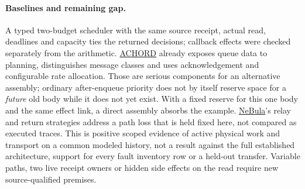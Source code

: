 \documentclass[11pt]{article}
\begin{document}
\paragraph{Baselines and remaining gap.}
A typed two-budget scheduler with the same source receipt,
actual read, deadlines and capacity ties the returned
decisions; callback effects were checked separately from
the arithmetic. \href{https://lillyclark.github.io/files/ACHORD_RA_L_IROS_.pdf}{ACHORD} already
exposes queue data to planning, distinguishes message classes
and uses acknowledgement and configurable rate allocation.
Those are serious components for an alternative assembly;
ordinary after-enqueue priority does not by itself reserve
space for a \emph{future} old body while it does not yet
exist. With a fixed reserve for this one body and the same
effect link, a direct assembly absorbs the example.
\href{https://arxiv.org/abs/2103.11470}{NeBula}'s relay and
return strategies address a path loss that is held fixed
here, not compared as executed traces. This is positive
scoped evidence of active physical work and transport
on a common modeled history, not a result against the full
established architecture, support for every fault inventory
row or a held-out transfer. Variable paths, two live receipt
owners or hidden side effects on the read require new
source-qualified premises.
\end{document}

